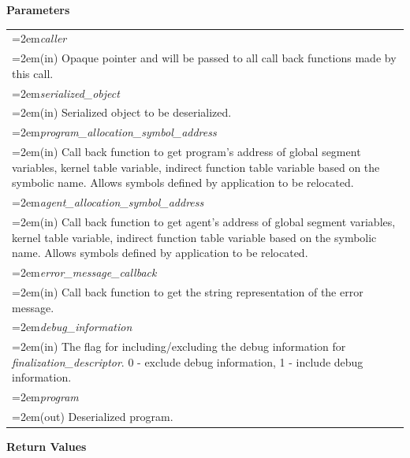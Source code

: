 \documentclass[final]{book}
\newcommand{\hsaarg}[1]{\textit{#1}}
\begin{document}
\noindent\textbf{Parameters}\\[-6mm]
\noindent\begin{longtable}{@{}>{\hangindent=2em}p{\textwidth}}
\hsaarg{caller}\\\hspace{2em}(in) Opaque pointer and will be passed to all call back functions made by this call.\\[2mm]
\hsaarg{serialized_object}\\\hspace{2em}(in) Serialized object to be deserialized.\\[2mm]
\hsaarg{program_allocation_symbol_address}\\\hspace{2em}(in) Call back function to get program's address of global segment variables, kernel table variable, indirect function table variable based on the symbolic name. Allows symbols defined by application to be relocated.\\[2mm]
\hsaarg{agent_allocation_symbol_address}\\\hspace{2em}(in) Call back function to get agent's address of global segment variables, kernel table variable, indirect function table variable based on the symbolic name. Allows symbols defined by application to be relocated.\\[2mm]
\hsaarg{error_message_callback}\\\hspace{2em}(in) Call back function to get the string representation of the error message.\\[2mm]
\hsaarg{debug_information}\\\hspace{2em}(in) The flag for including/excluding the debug information for \textit{finalization_descriptor}. 0 - exclude debug information, 1 - include debug information.\\[2mm]
\hsaarg{program}\\\hspace{2em}(out) Deserialized program.
\end{longtable}
\vspace{-5mm}\noindent\textbf{Return Values}\\[-6mm]
\end{document}
